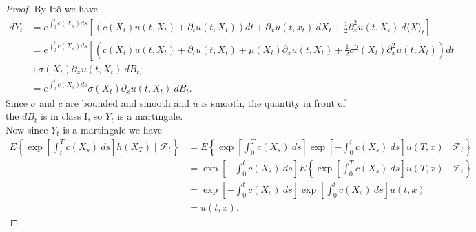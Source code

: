 \documentclass[11pt,letterpaper]{report}
\newcommand{\mcal}[1]{\mathcal{#1}}
\begin{document}
\begin{proof}
	By It\^o we have
	\begin{align*}
	dY_t &= e^{\int_0^tc(X_s)ds}\left[(c(X_t)u(t,X_t)+\partial_tu(t, X_t))dt + \partial_xu(t, x_t)\ dX_t + \frac{1}{2}\partial^2_xu(t, X_t)\ d\langle X\rangle_t\right]\\
	&= e^{\int_0^tc(X_s)ds}\left[\left(c(X_t)u(t,X_t) + \partial_tu(t, X_t) + \mu(X_t)\partial_xu(t, X_t) + \frac{1}{2}\sigma^2(X_t)\partial^2_xu(t, X_t)\right)dt\right.\\
	&+\sigma(X_t)\partial_xu(t, X_t)\ dB_t\bigg]\\
	&= e^{\int_0^tc(X_s)ds}\sigma(X_t)\partial_xu(t, X_t)\ dB_t.
	\end{align*}
	Since $\sigma$ and $c$ are bounded and smooth and $u$ is smooth, the quantity in front of the $dB_t$ is in class I, so $Y_t$ is a martingale.\\

	\noindent Now since $Y_t$ is a martingale we have
	\begin{align*}
		E\left\{\exp\left[\int_t^Tc(X_s)\ ds  \right]h(X_T)\mid \mcal{F}_t \right\} &= E\left\{\exp\left[\int_0^Tc(X_s)\ ds  \right]\exp\left[-\int_0^tc(X_s)\ ds  \right]u(T, x)\mid \mcal{F}_t \right\}\\
		&= \exp\left[-\int_0^tc(X_s)\ ds  \right]E\left\{\exp\left[\int_0^Tc(X_s)\ ds  \right]u(T, x)\mid \mcal{F}_t \right\}\\
		&= \exp\left[-\int_0^tc(X_s)\ ds  \right]\exp\left[\int_0^tc(X_s)\ ds  \right]u(t,x)\\
		&= u(t, x).
	\end{align*}
\end{proof}
\end{document}
